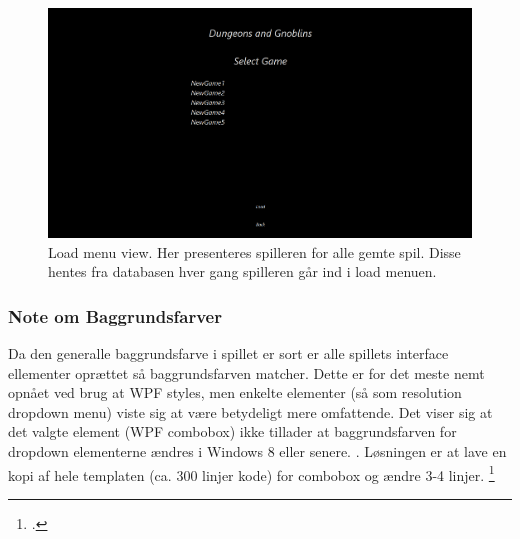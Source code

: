 \begin{figure}[h]
\centering
\includegraphics[width = \textwidth]{02-Body/Images/LoadMenu_final.png}
\caption{Load menu view. Her presenteres spilleren for alle gemte spil. Disse hentes fra databasen hver gang spilleren går ind i load menuen.}
\label{fig:Design-FE-impl-load}
\end{figure}

\subsubsection{Note om Baggrundsfarver}
Da den generalle baggrundsfarve i spillet er sort er alle spillets interface ellementer oprættet så baggrundsfarven matcher. Dette er for det meste nemt opnået ved brug at WPF styles, men enkelte elementer (så som resolution dropdown menu) viste sig at være betydeligt mere omfattende. Det viser sig at det valgte element (WPF combobox) ikke tillader at baggrundsfarven for dropdown elementerne ændres i Windows 8 eller senere. . Løsningen er at lave en kopi af hele templaten (ca. 300 linjer kode) for combobox og ændre 3-4 linjer. \footcite{https://social.technet.microsoft.com/wiki/contents/articles/24240.changing-the-background-color-of-a-combobox-in-wpf-on-windows-8.aspx}

\newpage
